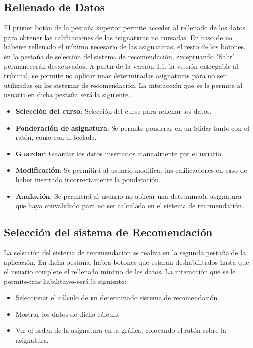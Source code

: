 \subsection{Rellenado de Datos}
El primer botón de la pestaña superior permite acceder al rellenado de los datos para obtener las calificaciones de las asignaturas no cursadas. En caso de no haberse rellenado el mínimo necesario de las asignaturas, el resto de los botones, en la pestaña de selección del sistema de recomendación, exceptuando "Salir" permanecerán desactivados.  A partir de la versión 1.1, la versión entregable al tribunal, se permite no aplicar unas determinadas asignaturas para no ser utilizadas en los sistemas de recomendación. 
La interacción que se le permite al usuario en dicha pestaña será la siguiente. 
\begin{itemize}
\item \textbf{Selección del curso}: Selección del curso para rellenar los datos. 
\item \textbf{Ponderación de asignatura}: Se permite ponderar en un Slider tanto con el ratón, como con el teclado.
\item \textbf{Guardar}: Guardar los datos insertados  manualmente  por el usuario. 
\item \textbf{Modificación}: Se permitirá al usuario modificar las calificaciones en caso de haber insertado incorrectamente la ponderación. 
\item \textbf{Anulación}: Se permitirá al usuario no aplicar una determinada asignatura que haya convalidado para no ser calculada en el sistema de recomendación. 
\end{itemize}

\subsection{Selección del sistema de Recomendación}
La selección del sistema de recomendación se realiza en la segunda pestaña de la aplicación. En dicha pestaña, habrá botones que  estarán deshabilitados hasta que el usuario complete el rellenado mínimo de los datos. 
La interacción que se le permite-tras habilitarse-será la siguiente: 
\begin{itemize}
\item Seleccionar el cálculo de un determinado sistema de recomendación. 
\item Mostrar los datos de dicho cálculo. 
\item Ver el orden de la asignatura en la gráfica, colocando el ratón sobre la asignatura. 
\end{itemize}

